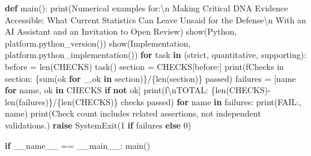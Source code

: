 \documentclass[
]{article}
\newenvironment{Shaded}{}{}
\newcommand{\BuiltInTok}[1]{\textcolor[rgb]{0.00,0.50,0.00}{#1}}
\newcommand{\CharTok}[1]{\textcolor[rgb]{0.25,0.44,0.63}{#1}}
\newcommand{\ControlFlowTok}[1]{\textcolor[rgb]{0.00,0.44,0.13}{\textbf{#1}}}
\newcommand{\DecValTok}[1]{\textcolor[rgb]{0.25,0.63,0.44}{#1}}
\newcommand{\KeywordTok}[1]{\textcolor[rgb]{0.00,0.44,0.13}{\textbf{#1}}}
\newcommand{\NormalTok}[1]{#1}
\newcommand{\OperatorTok}[1]{\textcolor[rgb]{0.40,0.40,0.40}{#1}}
\newcommand{\PreprocessorTok}[1]{\textcolor[rgb]{0.74,0.48,0.00}{#1}}
\newcommand{\SpecialCharTok}[1]{\textcolor[rgb]{0.25,0.44,0.63}{#1}}
\newcommand{\SpecialStringTok}[1]{\textcolor[rgb]{0.73,0.40,0.53}{#1}}
\newcommand{\StringTok}[1]{\textcolor[rgb]{0.25,0.44,0.63}{#1}}
\newcommand{\VariableTok}[1]{\textcolor[rgb]{0.10,0.09,0.49}{#1}}
\begin{document}
\begin{Shaded}
\begin{Highlighting}[]
\KeywordTok{def}\NormalTok{ main():}
    \BuiltInTok{print}\NormalTok{(}\StringTok{\textquotesingle{}Numerical examples for:}\CharTok{\textbackslash{}n}\StringTok{\textquotesingle{}}
          \StringTok{\textquotesingle{}Making Critical DNA Evidence Accessible: \textquotesingle{}}
          \StringTok{\textquotesingle{}What Current Statistics Can Leave Unsaid for the Defense}\CharTok{\textbackslash{}n}\StringTok{\textquotesingle{}}
          \StringTok{\textquotesingle{}With an AI Assistant and an Invitation to Open Review\textquotesingle{}}\NormalTok{)}
\NormalTok{    show(}\StringTok{\textquotesingle{}Python\textquotesingle{}}\NormalTok{, platform.python\_version())}
\NormalTok{    show(}\StringTok{\textquotesingle{}Implementation\textquotesingle{}}\NormalTok{, platform.python\_implementation())}
    \ControlFlowTok{for}\NormalTok{ task }\KeywordTok{in}\NormalTok{ (strict, quantitative, supporting):}
\NormalTok{        before }\OperatorTok{=} \BuiltInTok{len}\NormalTok{(CHECKS)}
\NormalTok{        task()}
\NormalTok{        section }\OperatorTok{=}\NormalTok{ CHECKS[before:]}
        \BuiltInTok{print}\NormalTok{(}\SpecialStringTok{f\textquotesingle{}Checks in section: }\SpecialCharTok{\{}\BuiltInTok{sum}\NormalTok{(ok }\ControlFlowTok{for}\NormalTok{ \_,ok }\KeywordTok{in}\NormalTok{ section)}\SpecialCharTok{\}}\SpecialStringTok{/}\SpecialCharTok{\{}\BuiltInTok{len}\NormalTok{(section)}\SpecialCharTok{\}}\SpecialStringTok{ passed\textquotesingle{}}\NormalTok{)}
\NormalTok{    failures }\OperatorTok{=}\NormalTok{ [name }\ControlFlowTok{for}\NormalTok{ name, ok }\KeywordTok{in}\NormalTok{ CHECKS }\ControlFlowTok{if} \KeywordTok{not}\NormalTok{ ok]}
    \BuiltInTok{print}\NormalTok{(}\SpecialStringTok{f\textquotesingle{}}\CharTok{\textbackslash{}n}\SpecialStringTok{TOTAL: }\SpecialCharTok{\{}\BuiltInTok{len}\NormalTok{(CHECKS)}\OperatorTok{{-}}\BuiltInTok{len}\NormalTok{(failures)}\SpecialCharTok{\}}\SpecialStringTok{/}\SpecialCharTok{\{}\BuiltInTok{len}\NormalTok{(CHECKS)}\SpecialCharTok{\}}\SpecialStringTok{ checks passed\textquotesingle{}}\NormalTok{)}
    \ControlFlowTok{for}\NormalTok{ name }\KeywordTok{in}\NormalTok{ failures:}
        \BuiltInTok{print}\NormalTok{(}\StringTok{\textquotesingle{}FAIL:\textquotesingle{}}\NormalTok{, name)}
    \BuiltInTok{print}\NormalTok{(}\StringTok{\textquotesingle{}Check count includes related assertions, not independent validations.\textquotesingle{}}\NormalTok{)}
    \ControlFlowTok{raise} \PreprocessorTok{SystemExit}\NormalTok{(}\DecValTok{1} \ControlFlowTok{if}\NormalTok{ failures }\ControlFlowTok{else} \DecValTok{0}\NormalTok{)}


\ControlFlowTok{if} \VariableTok{\_\_name\_\_} \OperatorTok{==} \StringTok{\textquotesingle{}\_\_main\_\_\textquotesingle{}}\NormalTok{:}
\NormalTok{    main()}
\end{Highlighting}
\end{Shaded}
\end{document}
